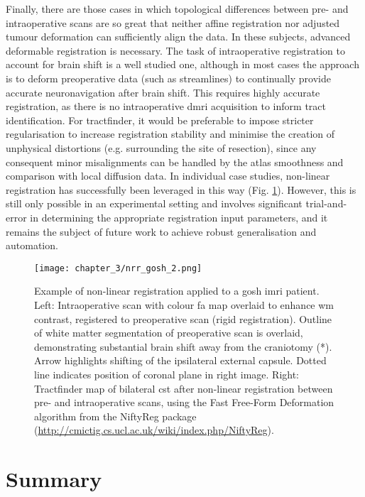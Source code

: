 Finally, there are those cases in which topological differences between pre- and intraoperative scans are so great that neither affine registration nor adjusted tumour deformation can sufficiently align the data.
In these subjects, advanced deformable registration is necessary.
The task of intraoperative registration to account for brain shift is a well studied one, although in most cases the approach is to deform preoperative data (such as streamlines) to continually provide accurate neuronavigation after brain shift.\autocite{Clatz2005,Archip2007,Wittek2007,Archip2008}
This requires highly accurate registration, as there is no intraoperative \gls{dmri} acquisition to inform tract identification.
For tractfinder, it would be preferable to impose stricter regularisation to increase registration stability and minimise the creation of unphysical distortions (e.g. surrounding the site of resection), since any consequent minor misalignments can be handled by the atlas smoothness and comparison with local diffusion data.
In individual case studies, non-linear registration has successfully been leveraged in this way (Fig. \ref{fig:nrrex}).
However, this is still only possible in an experimental setting and involves significant trial-and-error in determining the appropriate registration input parameters, and it remains the subject of future work to achieve robust generalisation and automation.

\begin{figure}[hb!]
  \centering
  \texttt{[image: chapter\_3/nrr\_gosh\_2.png]}
  \caption{Example of non-linear registration applied to a \gls{gosh} \gls{imri} patient. Left: Intraoperative scan with colour \gls{fa} map overlaid to enhance \gls{wm} contrast, registered to preoperative scan (rigid registration). Outline of white matter segmentation of preoperative scan is overlaid, demonstrating substantial brain shift away from the craniotomy (*). Arrow highlights shifting of the ipsilateral external capsule. Dotted line indicates position of coronal plane in right image. Right: Tractfinder map of bilateral \gls{cst} after non-linear registration between pre- and intraoperative scans, using the Fast Free-Form Deformation algorithm\autocite{Modat2010} from the NiftyReg package (\url{http://cmictig.cs.ucl.ac.uk/wiki/index.php/NiftyReg}).}
  \label{fig:nrrex}
\end{figure}

\section{Summary}

